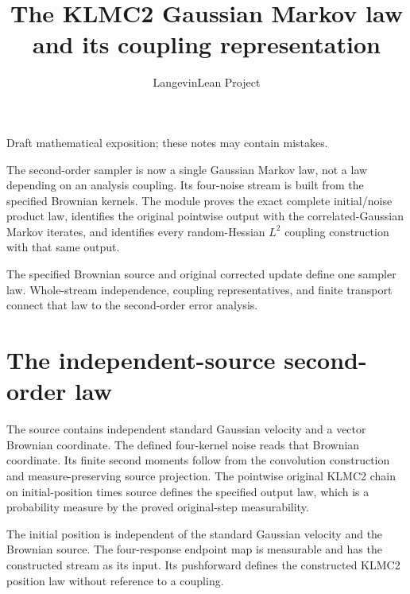 \documentclass[11pt,a4paper]{article}
\title{\texorpdfstring{The KLMC2 Gaussian Markov law and its coupling representation}{The KLMC2 Gaussian Markov law and its coupling representation}}
\author{LangevinLean Project}
\date{}
\begin{document}
\maketitle
Draft mathematical exposition; these notes may contain mistakes.


The second-order sampler is now a single Gaussian Markov law, not a law depending on an analysis coupling. Its four-noise stream is built from the specified Brownian kernels. The module proves the exact complete initial/\allowbreak{}noise product law, identifies the original pointwise output with the correlated-Gaussian Markov iterates, and identifies every random-Hessian \(L^{2}\) coupling construction with that same output.



The specified Brownian source and original corrected update define one sampler law. Whole-stream independence, coupling representatives, and finite transport connect that law to the second-order error analysis.


\section{\texorpdfstring{The independent-source second-order law}{The independent-source second-order law}}


The source contains independent standard Gaussian velocity and a vector Brownian coordinate. The defined four-kernel noise reads that Brownian coordinate. Its finite second moments follow from the convolution construction and measure-preserving source projection. The pointwise original KLMC2 chain on initial-position times source defines the specified output law, which is a probability measure by the proved original-step measurability.



The initial position is independent of the standard Gaussian velocity and the Brownian source. The four-response endpoint map is measurable and has the constructed stream as its input. Its pushforward defines the constructed KLMC2 position law without reference to a coupling.
\end{document}
